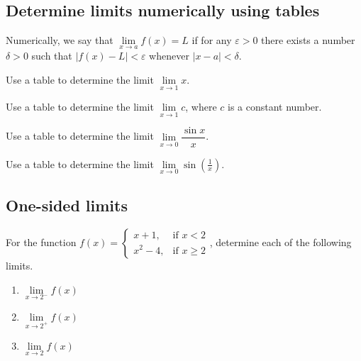 \hypertarget{determine-limits-numerically-using-tables}{%
\subsection{Determine limits numerically using
tables}\label{determine-limits-numerically-using-tables}}

Numerically, we say that
\(\lim\limits_{x\to a}f(x)=L\) if for any \(\varepsilon>0\) there exists
a number \(\delta>0\) such that \(|f(x)-L|<\varepsilon\) whenever
\(|x-a|<\delta\).

\begin{example}
  Use a table to determine the limit
  \(\lim\limits_{x\to 1}x\).
\end{example}
\vspace*{6\baselineskip}

\begin{example}
  Use a table to determine the limit
  \(\lim\limits_{x\to 1}c\), where \(c\) is a constant number.
\end{example}
\vspace*{6\baselineskip}

\begin{example}
  Use a table to determine the limit
  \(\lim\limits_{x\to 0}\dfrac{\sin x}{x}\).
\end{example}
\vspace*{6\baselineskip}

\begin{example}
  Use a table to determine the limit
  \(\lim\limits_{x\to 0}\sin\left(\frac1x\right)\).
\end{example}
\vspace*{6\baselineskip}

\subsection{One-sided limits}

\begin{example}
  For the function
  \(f(x)=\begin{cases}x+1, & \text{if }x<2\\ x^2-4, & \text{if }x\ge 2\end{cases}\),
  determine each of the following limits.
  
  \begin{enumerate}
  \item
    \(\lim\limits_{x \to 2^-}f(x)\)
  \item
    \(\lim\limits_{x \to 2^+}f(x)\)
  \item
    \(\lim\limits_{x\to 2}f(x)\)
  \end{enumerate}
\end{example}

